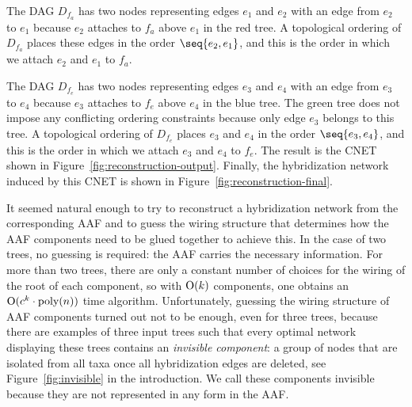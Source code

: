 The DAG $D_{f_a}$ has two nodes representing edges $e_1$ and $e_2$ with an edge from $e_2$ to $e_1$ because $e_2$ attaches to $f_a$ above $e_1$ in the red tree. A topological ordering of $D_{f_a}$ places these edges in the order $\seq{e_2, e_1}$, and {this} is the order in which we attach $e_2$ and $e_1$ to $f_a$.

The DAG $D_{f_e}$ has two nodes representing edges $e_3$ and $e_4$ with an edge from $e_3$ to $e_4$ because $e_3$ attaches to $f_e$ above $e_4$ in the blue tree. The green tree does not impose any conflicting ordering constraints because only edge $e_3$ belongs to this tree. A topological ordering of $D_{f_e}$ places $e_3$ and $e_4$ in the order $\seq{e_3, e_4}$, and this is the order in which we attach $e_3$ and $e_4$ to $f_e$. The result is the CNET shown in Figure~\ref{fig:reconstruction-output}. 
{Finally, the hybridization network induced by this CNET is shown in Figure~\ref{fig:reconstruction-final}.}




It seemed natural enough to try to reconstruct a hybridization network from the corresponding AAF and {to guess} the wiring structure that determines how the AAF components need to be glued together to achieve this. In the case of two trees, no guessing is required: the AAF carries the necessary information. For more than two trees, there are only a constant number of choices for the wiring of the root of each component, so with $\mathrm{O}(k)$ components, one obtains an $\mathrm{O}(c^k \cdot \text{poly}(n))$ time algorithm. Unfortunately, guessing the wiring structure of AAF components turned out not to be enough, even for three trees, because there are examples of three input trees such that every optimal network displaying these trees contains an \emph{invisible component}: a group of nodes that are isolated from all taxa once all hybridization edges are deleted, see Figure~\ref{fig:invisible} {in the introduction}. We call these components invisible because they are not represented in any form in the AAF.

